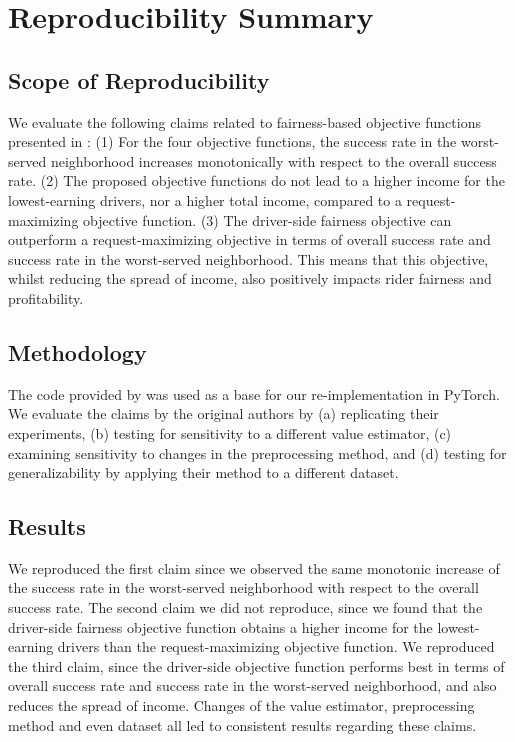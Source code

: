 \section*{\centering Reproducibility Summary}

\subsection*{Scope of Reproducibility}


We evaluate the following claims related to fairness-based objective functions presented in \cite{raman_data-driven_2021}: (1) For the four objective functions, the success rate in the worst-served neighborhood increases monotonically with respect to the overall success rate. (2) The proposed objective functions do not lead to a higher income for the lowest-earning drivers, nor a higher total income, compared to a request-maximizing objective function. (3) The driver-side fairness objective can outperform a request-maximizing objective in terms of overall success rate and success rate in the worst-served neighborhood. This means that this objective, whilst reducing the spread of income, also positively impacts rider fairness and profitability.


\subsection*{Methodology}
The code provided by \cite{raman_data-driven_2021} was used as a base for our re-implementation in PyTorch. We evaluate the claims by the original authors by (a) replicating their experiments, (b) testing for sensitivity to a different value estimator, (c) examining sensitivity to changes in the preprocessing method, and (d) testing for generalizability by applying their method to a different dataset.

\subsection*{Results}

We reproduced the first claim since we observed the same monotonic increase of the success rate in the worst-served neighborhood with respect to the overall success rate. The second claim we did not reproduce, since we found that the driver-side fairness objective function obtains a higher income for the lowest-earning drivers than the request-maximizing objective function. We reproduced the third claim, since the driver-side objective function performs best in terms of overall success rate and success rate in the worst-served neighborhood, and also reduces the spread of income. Changes of the value estimator, preprocessing method and even dataset all led to consistent results regarding these claims.

